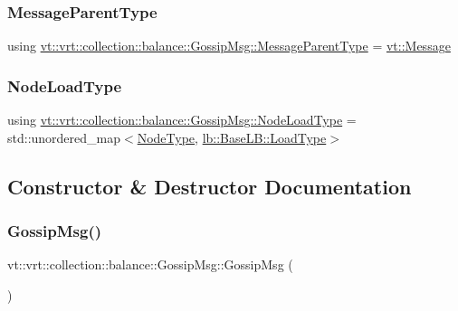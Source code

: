 \subsubsection{\texorpdfstring{Message\+Parent\+Type}{MessageParentType}}
{\footnotesize\ttfamily using \hyperlink{structvt_1_1vrt_1_1collection_1_1balance_1_1_gossip_msg_a640e492438ba6fd6c8affa25ed0f17fc}{vt\+::vrt\+::collection\+::balance\+::\+Gossip\+Msg\+::\+Message\+Parent\+Type} =  \hyperlink{namespacevt_a3a3ddfef40b4c90915fa43cdd5f129ea}{vt\+::\+Message}}

\mbox{\label{structvt_1_1vrt_1_1collection_1_1balance_1_1_gossip_msg_a8deef056cb137cfd67540a31be189122}} 
\subsubsection{\texorpdfstring{Node\+Load\+Type}{NodeLoadType}}
{\footnotesize\ttfamily using \hyperlink{structvt_1_1vrt_1_1collection_1_1balance_1_1_gossip_msg_a8deef056cb137cfd67540a31be189122}{vt\+::vrt\+::collection\+::balance\+::\+Gossip\+Msg\+::\+Node\+Load\+Type} =  std\+::unordered\+\_\+map$<$\hyperlink{namespacevt_a866da9d0efc19c0a1ce79e9e492f47e2}{Node\+Type}, \hyperlink{structvt_1_1vrt_1_1collection_1_1lb_1_1_base_l_b_a215e22b9f12678303f49615ae3be05cc}{lb\+::\+Base\+L\+B\+::\+Load\+Type}$>$}



\subsection{Constructor \& Destructor Documentation}
\mbox{\label{structvt_1_1vrt_1_1collection_1_1balance_1_1_gossip_msg_ae5d9af18865ffcbf49139e587d6117b6}} 
\subsubsection{\texorpdfstring{Gossip\+Msg()}{GossipMsg()}\hspace{0.1cm}{\footnotesize\ttfamily [1/2]}}
{\footnotesize\ttfamily vt\+::vrt\+::collection\+::balance\+::\+Gossip\+Msg\+::\+Gossip\+Msg (\begin{DoxyParamCaption}{ }\end{DoxyParamCaption})\hspace{0.3cm}{\ttfamily [default]}}

